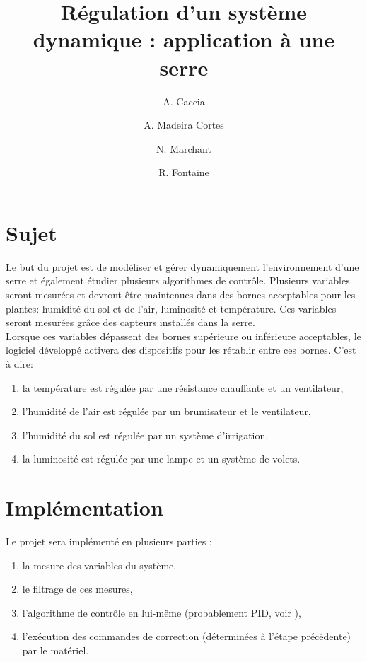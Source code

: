\documentclass[a4paper,10pt]{article}
\title{Régulation d'un système dynamique : application à une serre}
\author{A. Caccia \and A. Madeira Cortes \and N. Marchant \and R. Fontaine}
\date{ }
\begin{document}
\maketitle

\vspace{1cm}

\section{Sujet}

Le but du projet est de modéliser et gérer dynamiquement l'environnement d'une serre et également étudier plusieurs algorithmes de contrôle. Plusieurs variables seront mesurées et devront être maintenues dans des bornes acceptables pour les plantes: humidité du sol et de l'air, luminosité et température. Ces variables seront mesurées grâce des capteurs installés dans la serre. \\

Lorsque ces variables dépassent des bornes supérieure ou inférieure acceptables, le logiciel développé activera des dispositifs pour les rétablir entre ces bornes. C'est à dire:

\begin{enumerate}
	\item la température est régulée par une résistance chauffante et un ventilateur,
	\item l'humidité de l'air est régulée par un brumisateur et le ventilateur,
	\item l'humidité du sol est régulée par un système d'irrigation,
	\item la luminosité est régulée par une lampe et un système de volets.\\
\end{enumerate}

\section{Implémentation}

Le projet sera implémenté en plusieurs parties :

\begin{enumerate}
    \item la mesure des variables du système,
    \item le filtrage de ces mesures,
    \item l'algorithme de contrôle en lui-même (probablement PID, voir \cite{Kinnaert2013}),
    \item l'exécution des commandes de correction (déterminées à l'étape précédente) par le matériel.\\
\end{enumerate}
\end{document}
